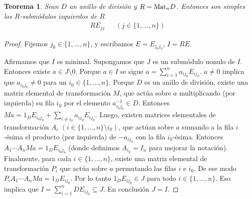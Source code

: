 \documentclass{report}
\newcommand{\Mat}{\textnormal{Mat}}
\newtheorem{theorem}{Teorema}
\begin{document}
  \begin{theorem}
    Sean \(D\) un anillo de división y \(R = \Mat_n D\).
    Entonces son simples los \(R\)-submódulos izquierdos de \(R\)
    \begin{align}
      R E_{j j}
      &&(j \in \{1, \dots, n\})
    \end{align}
  \end{theorem}
  \begin{proof}
    Fijemos \(j_0 \in \{1, \dots, n\}\), y escribamos \(E = E_{j_0 j_0}\), \(I = R E\).

    Afirmamos que \(I\) es minimal.
    Supongamos que \(J\) es un submódulo nonulo de \(I\).
    Entonces existe \(a \in J \setminus 0\).
    Porque \(a \in I\) se sigue \(a = \sum_{i = 1}^n a_{i j_0} E_{i j_0}\).
    \(a \neq 0\) implica que \(a_{i_0 j_0} \neq 0\) para un \(i_0 \in \{1, \dots, n\}\).
    Porque \(D\) es un anillo de división, existe una matriz elemental de transformación \(M\), que actúa sobre \(a\) multiplicando (por izquierda) su fila \(i_0\) por el elemento \(a_{i_0 j_0}^{- 1} \in D\).
    Entonces \(M a = 1_D E_{i_0 j_0} + \sum_{i \neq i_0} a_{i j_0} E_{i j_0}\).
    Luego, existen matrices elementales de transformación \(A_i\) \((i \in \{1, \dots, n\} \setminus i_0)\), que actúan sobre \(a\) sumando a la fila \(i\)-ésima el producto (por izquierda) de \(- a_{i j_0}\) con la fila \(i_0\)-ésima.
    Entonces \(A_1 \cdots A_n M a = 1_D E_{i_0 j_0}\) (donde definimos \(A_{i_0} = I_n\) para mejorar la notación).
    Finalmente, para cada \(i \in \{1, \dots, n\}\), existe una matriz elemental de transformación \(P_i\) que actúa sobre \(a\) permutando las filas \(i\) e \(i_0\).
    De ese modo \(P_i A_1 \cdots A_n M a = 1_D E_{i j_0}\).
    Por lo tanto \(1_D E_{i j_0} \in J\) para todo \(i \in \{1, \dots, n\}\).
    Eso implica que \(I = \sum_{i = 1}^n D E_{i j_0} \subseteq J\).
    En conclusión \(J = I\).
  \end{proof}
\end{document}
